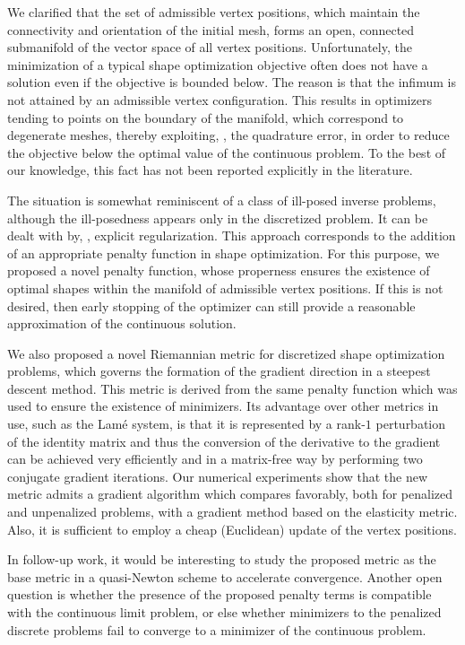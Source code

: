 We clarified that the set of admissible vertex positions, which maintain the connectivity and orientation of the initial mesh, forms an open, connected submanifold of the vector space of all vertex positions.
Unfortunately, the minimization of a typical shape optimization objective often does not have a solution even if the objective is bounded below.
The reason is that the infimum is not attained by an admissible vertex configuration.
This results in optimizers tending to points on the boundary of the manifold, which correspond to degenerate meshes, thereby exploiting, \eg, the quadrature error, in order to reduce the objective below the optimal value of the continuous problem.
To the best of our knowledge, this fact has not been reported explicitly in the literature.

The situation is somewhat reminiscent of a class of ill-posed inverse problems, although the ill-posedness appears only in the discretized problem.
It can be dealt with by, \eg, explicit regularization.
This approach corresponds to the addition of an appropriate penalty function in shape optimization.
For this purpose, we proposed a novel penalty function, whose properness ensures the existence of optimal shapes within the manifold of admissible vertex positions.
If this is not desired, then early stopping of the optimizer can still provide a reasonable approximation of the continuous solution.

We also proposed a novel Riemannian metric for discretized shape optimization problems, which governs the formation of the gradient direction in a steepest descent method.
This metric is derived from the same penalty function which was used to ensure the existence of minimizers.
Its advantage over other metrics in use, such as the Lamé system, is that it is represented by a rank-$1$ perturbation of the identity matrix and thus the conversion of the derivative to the gradient can be achieved very efficiently and in a matrix-free way by performing two conjugate gradient iterations.
Our numerical experiments show that the new metric admits a gradient algorithm which compares favorably, both for penalized and unpenalized problems, with a gradient method based on the elasticity metric.
Also, it is sufficient to employ a cheap (Euclidean) update of the vertex positions.

In follow-up work, it would be interesting to study the proposed metric as the base metric in a quasi-Newton scheme to accelerate convergence.
Another open question is whether the presence of the proposed penalty terms is compatible with the continuous limit problem, or else whether minimizers to the penalized discrete problems fail to converge to a minimizer of the continuous problem.


